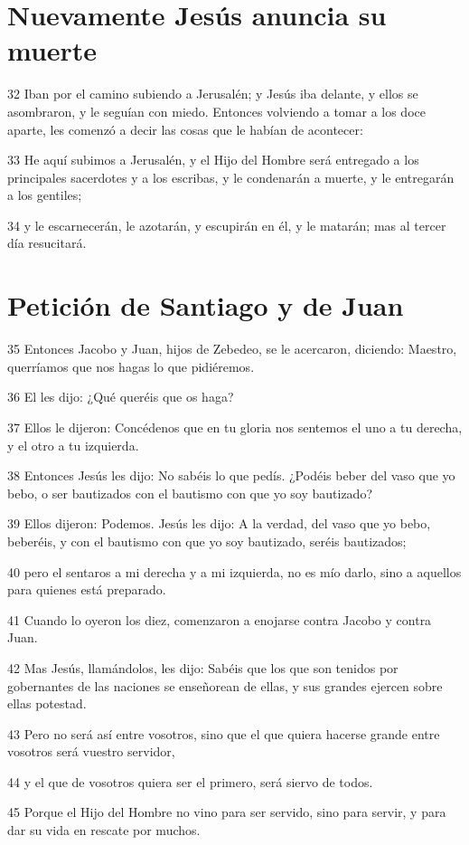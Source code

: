 \section*{Nuevamente Jesús anuncia su muerte}

\par 32 Iban por el camino subiendo a Jerusalén; y Jesús iba delante, y ellos se asombraron, y le seguían con miedo. Entonces volviendo a tomar a los doce aparte, les comenzó a decir las cosas que le habían de acontecer:
\par 33 He aquí subimos a Jerusalén, y el Hijo del Hombre será entregado a los principales sacerdotes y a los escribas, y le condenarán a muerte, y le entregarán a los gentiles;
\par 34 y le escarnecerán, le azotarán, y escupirán en él, y le matarán; mas al tercer día resucitará.

\section*{Petición de Santiago y de Juan}

\par 35 Entonces Jacobo y Juan, hijos de Zebedeo, se le acercaron, diciendo: Maestro, querríamos que nos hagas lo que pidiéremos.
\par 36 El les dijo: ¿Qué queréis que os haga?
\par 37 Ellos le dijeron: Concédenos que en tu gloria nos sentemos el uno a tu derecha, y el otro a tu izquierda.
\par 38 Entonces Jesús les dijo: No sabéis lo que pedís. ¿Podéis beber del vaso que yo bebo, o ser bautizados con el bautismo con que yo soy bautizado?
\par 39 Ellos dijeron: Podemos. Jesús les dijo: A la verdad, del vaso que yo bebo, beberéis, y con el bautismo con que yo soy bautizado, seréis bautizados;
\par 40 pero el sentaros a mi derecha y a mi izquierda, no es mío darlo, sino a aquellos para quienes está preparado.
\par 41 Cuando lo oyeron los diez, comenzaron a enojarse contra Jacobo y contra Juan.
\par 42 Mas Jesús, llamándolos, les dijo: Sabéis que los que son tenidos por gobernantes de las naciones se enseñorean de ellas, y sus grandes ejercen sobre ellas potestad.
\par 43 Pero no será así entre vosotros, sino que el que quiera hacerse grande entre vosotros será vuestro servidor,
\par 44 y el que de vosotros quiera ser el primero, será siervo de todos.
\par 45 Porque el Hijo del Hombre no vino para ser servido, sino para servir, y para dar su vida en rescate por muchos.

